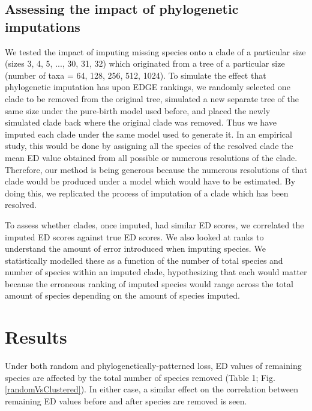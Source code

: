 \documentclass[12pt,english]{article}
\begin{document}
\subsection*{Assessing the impact of phylogenetic imputations}
We tested the impact of imputing missing species onto a clade of a particular
size (sizes 3, 4, 5, ..., 30, 31, 32) which originated from a tree of a
particular size (number of taxa = 64, 128, 256, 512, 1024). To simulate the
effect that phylogenetic imputation has upon EDGE rankings, we randomly selected
one clade to be removed from the original tree, simulated a new separate tree of
the same size under the pure-birth model used before, and placed the newly
simulated clade back where the original clade was removed. Thus we have imputed
each clade under the same model used to generate it. In an empirical study, this
would be done by assigning all the species of the resolved clade the mean ED
value obtained from all possible or numerous resolutions of the clade.
Therefore, our method is being generous because the numerous resolutions of that
clade would be produced under a model which would have to be estimated. By doing
this, we replicated the process of imputation of a clade which has been
resolved. 

To assess whether clades, once imputed, had similar ED scores, we
correlated the imputed ED scores against true ED scores. We also looked at ranks
to understand the amount of error introduced when imputing species. We
statistically modelled these as a function of the number of total species and
number of species within an imputed clade, hypothesizing that each would matter
because the erroneous ranking of imputed species would range across the total
amount of species depending on the amount of species imputed.

\section*{Results}
Under both random and phylogenetically-patterned loss, ED values of remaining
species are affected by the total number of species removed (Table 1;
Fig. \ref{randomVsClustered}). In either case, a similar effect on the correlation
between remaining ED values before and after species are removed is seen.   
\end{document}
